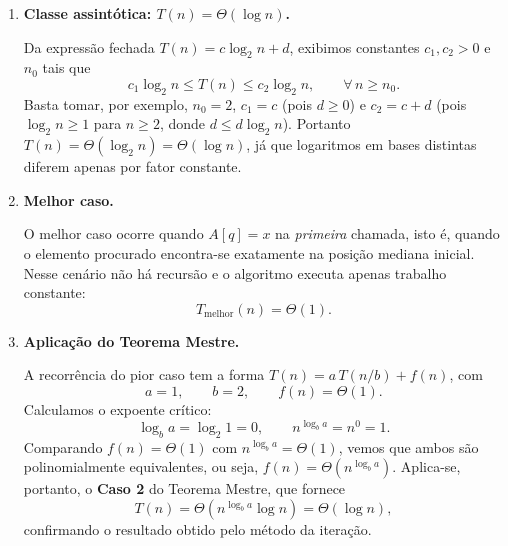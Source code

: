 \documentclass[9pt,a4paper]{extarticle}
\begin{document}
\begin{itemize}
\begin{enumerate}[label=(\alph*)]
    Para $n = 2^k$, os pisos são exatos: $\lfloor n/2 \rfloor = n/2 = 2^{k-1}$. Seja $c$ uma constante positiva que limita o custo não recursivo. Então:
    \begin{align*}
        T(n) &= T(n/2) + c \\
             &= \bigl[T(n/4) + c\bigr] + c = T(n/4) + 2c \\
             &= \bigl[T(n/8) + c\bigr] + 2c = T(n/8) + 3c \\
             &\;\;\vdots \\
             &= T(n/2^i) + i\,c.
    \end{align*}
    A iteração termina quando $n/2^i = 1$, ou seja, $i = \log_2 n = k$. Logo,
    \[
        T(n) = T(1) + k\,c = \Theta(1) + c \log_2 n.
    \]
    Tomando $T(1) = d$ constante, obtemos a forma fechada
    \[
        \boxed{\,T(n) = c \log_2 n + d.\,}
    \]
    
    \medskip
    
    \item \textbf{Classe assintótica: $T(n) = \Theta(\log n)$.}
    
    Da expressão fechada $T(n) = c \log_2 n + d$, exibimos constantes $c_1, c_2 > 0$ e $n_0$ tais que
    \[
        c_1 \log_2 n \leq T(n) \leq c_2 \log_2 n, \qquad \forall\, n \geq n_0.
    \]
    Basta tomar, por exemplo, $n_0 = 2$, $c_1 = c$ (pois $d \geq 0$) e $c_2 = c + d$ (pois $\log_2 n \geq 1$ para $n \geq 2$, donde $d \leq d \log_2 n$). Portanto $T(n) = \Theta(\log_2 n) = \Theta(\log n)$, já que logaritmos em bases distintas diferem apenas por fator constante.
    
    \medskip
    
    \item \textbf{Melhor caso.}
    
    O melhor caso ocorre quando $A[q] = x$ na \emph{primeira} chamada, isto é, quando o elemento procurado encontra-se exatamente na posição mediana inicial. Nesse cenário não há recursão e o algoritmo executa apenas trabalho constante:
    \[
        T_{\text{melhor}}(n) = \Theta(1).
    \]
    
    \medskip
    
    \item \textbf{Aplicação do Teorema Mestre.}
    
    A recorrência do pior caso tem a forma $T(n) = a\,T(n/b) + f(n)$, com
    \[
        a = 1, \qquad b = 2, \qquad f(n) = \Theta(1).
    \]
    Calculamos o expoente crítico:
    \[
        \log_b a = \log_2 1 = 0, 
        \qquad 
        n^{\log_b a} = n^0 = 1.
    \]
    Comparando $f(n) = \Theta(1)$ com $n^{\log_b a} = \Theta(1)$, vemos que ambos são polinomialmente equivalentes, ou seja, $f(n) = \Theta(n^{\log_b a})$. Aplica-se, portanto, o \textbf{Caso 2} do Teorema Mestre, que fornece
    \[
        T(n) = \Theta\!\left(n^{\log_b a} \log n\right) = \Theta(\log n),
    \]
    confirmando o resultado obtido pelo método da iteração.
\end{enumerate}

\end{itemize}
\end{document}
